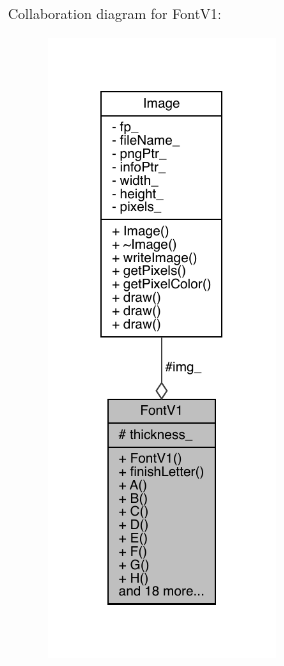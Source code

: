 Collaboration diagram for Font\+V1\+:\nopagebreak
\begin{figure}[H]
\begin{center}
\leavevmode
\includegraphics[width=171pt]{class_font_v1__coll__graph}
\end{center}
\end{figure}
